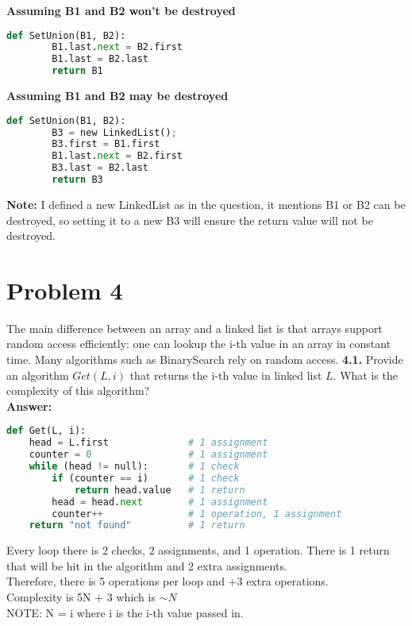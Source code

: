 \documentclass{article}
\begin{document}
\pagebreak
\textbf{Assuming B1 and B2 won't be destroyed}
\begin{lstlisting}[language=Python]
    def SetUnion(B1, B2):
        B1.last.next = B2.first
        B1.last = B2.last
        return B1
\end{lstlisting}

\textbf{Assuming B1 and B2 may be destroyed}
\begin{lstlisting}[language=Python]
    def SetUnion(B1, B2):
        B3 = new LinkedList();
        B3.first = B1.first
        B1.last.next = B2.first
        B3.last = B2.last
        return B3
\end{lstlisting}

\textbf{Note:} I defined a new LinkedList as in the question, it mentions B1 or B2 can be destroyed, so setting it to a new B3 will ensure the return value will not be destroyed.

\section*{Problem 4}
The main difference between an array and a linked list is that arrays support random access
efficiently: one can lookup the i-th value in an array in constant time. Many algorithms such as BinarySearch rely on random access.
 \textbf{4.1.} Provide an algorithm $Get(L,i)$ that returns the i-th value in linked list $L$. What is the complexity of this algorithm?\\

\noindent \textbf{Answer: }

\begin{lstlisting}[language=Python]
def Get(L, i):
    head = L.first              # 1 assignment
    counter = 0                 # 1 assignment
    while (head != null):       # 1 check
        if (counter == i)       # 1 check
            return head.value   # 1 return
        head = head.next        # 1 assignment
        counter++               # 1 operation, 1 assignment
    return "not found"          # 1 return
\end{lstlisting}

\noindent Every loop there is 2 checks, 2 assignments, and 1 operation. There is 1 return that will be hit in the algorithm and 2 extra assignments.\\
Therefore, there is 5 operations per loop and +3 extra operations.\\
Complexity is 5N + 3 which is $\sim N$\\
NOTE: N = i where i is the i-th value passed in.\\
\end{document}

